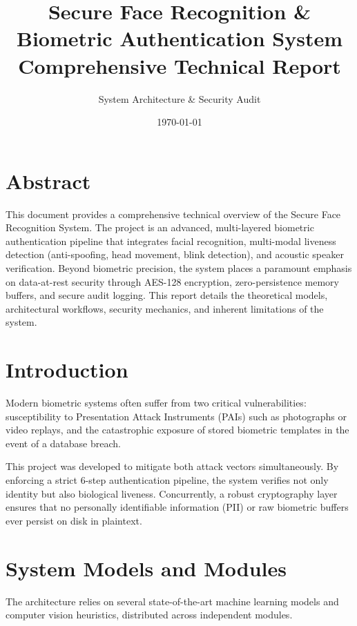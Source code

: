 \documentclass[12pt,a4paper]{article}
\title{\textbf{Secure Face Recognition \& Biometric Authentication System}\\ \Large Comprehensive Technical Report}
\author{System Architecture \& Security Audit}
\date{\today}
\begin{document}
\maketitle
\tableofcontents
\newpage

\section{Abstract}
This document provides a comprehensive technical overview of the Secure Face Recognition System. The project is an advanced, multi-layered biometric authentication pipeline that integrates facial recognition, multi-modal liveness detection (anti-spoofing, head movement, blink detection), and acoustic speaker verification. Beyond biometric precision, the system places a paramount emphasis on data-at-rest security through AES-128 encryption, zero-persistence memory buffers, and secure audit logging. This report details the theoretical models, architectural workflows, security mechanics, and inherent limitations of the system.

\section{Introduction}
Modern biometric systems often suffer from two critical vulnerabilities: susceptibility to Presentation Attack Instruments (PAIs) such as photographs or video replays, and the catastrophic exposure of stored biometric templates in the event of a database breach. 

This project was developed to mitigate both attack vectors simultaneously. By enforcing a strict 6-step authentication pipeline, the system verifies not only identity but also biological liveness. Concurrently, a robust cryptography layer ensures that no personally identifiable information (PII) or raw biometric buffers ever persist on disk in plaintext.

\section{System Models and Modules}
The architecture relies on several state-of-the-art machine learning models and computer vision heuristics, distributed across independent modules.
\end{document}
